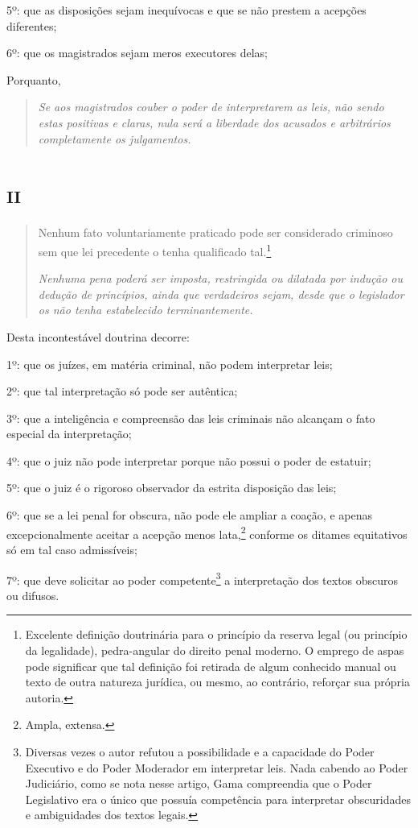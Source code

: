 5º: que as disposições sejam inequívocas e que se não prestem a acepções
diferentes;

6º: que os magistrados sejam meros executores delas;

Porquanto,

\begin{quote}
\emph{Se aos magistrados couber o poder de interpretarem as leis, não
sendo estas positivas e claras, nula será a liberdade dos acusados e
arbitrários completamente os julgamentos.}
\end{quote}

\section{\textsc{ii}}

\begin{quote}
Nenhum fato voluntariamente praticado pode ser considerado criminoso
sem que lei precedente o tenha qualificado tal.\footnote{Excelente
  definição doutrinária para o princípio da reserva legal (ou princípio
  da legalidade), pedra-angular do direito penal moderno. O emprego de
  aspas pode significar que tal definição foi retirada de algum
  conhecido manual ou texto de outra natureza jurídica, ou mesmo, ao
  contrário, reforçar sua própria autoria.}

\emph{Nenhuma pena poderá ser imposta, restringida ou dilatada por
indução ou dedução de princípios, ainda que verdadeiros sejam, desde que
o legislador os não tenha estabelecido terminantemente.}
\end{quote}

Desta incontestável doutrina decorre:

1º: que os juízes, em matéria criminal, não podem interpretar leis;

2º: que tal interpretação só pode ser autêntica;

3º: que a inteligência e compreensão das leis criminais não alcançam o
fato especial da interpretação;

4º: que o juiz não pode interpretar porque não possui o poder de
estatuir;

5º: que o juiz é o rigoroso observador da estrita disposição das leis;

6º: que se a lei penal for obscura, não pode ele ampliar a coação, e
apenas excepcionalmente aceitar a acepção menos lata,\footnote{Ampla,
  extensa.} conforme os ditames equitativos só em tal caso admissíveis;

7º: que deve solicitar ao poder competente\footnote{Diversas vezes o
  autor refutou a possibilidade e a capacidade do Poder Executivo e do
  Poder Moderador em interpretar leis. Nada cabendo ao Poder Judiciário,
  como se nota nesse artigo, Gama compreendia que o Poder Legislativo
  era o único que possuía competência para interpretar obscuridades e
  ambiguidades dos textos legais.} a interpretação dos textos obscuros
ou difusos.

